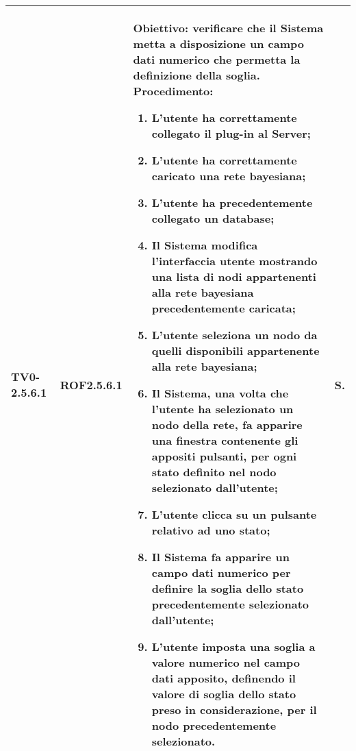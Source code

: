 \begin{longtable}{|C{.15\textwidth}|C{.13\textwidth}|m{.65\textwidth}|C{.08\textwidth}|}
TV0-2.5.6.1 & ROF2.5.6.1 &
	\textbf{Obiettivo}: verificare che il Sistema metta a disposizione un campo dati numerico che permetta la definizione della soglia. \newline
	\textbf{Procedimento}:
	\begin{enumerate}
		\item L'utente ha correttamente collegato il plug-in al Server;
		\item L'utente ha correttamente caricato una rete bayesiana;
		\item L'utente ha precedentemente collegato un database;
		\item Il Sistema modifica l'interfaccia utente mostrando una lista di nodi appartenenti alla rete bayesiana precedentemente caricata;
		\item L'utente seleziona un nodo da quelli disponibili appartenente alla rete bayesiana;
		\item Il Sistema, una volta che l'utente ha selezionato un nodo della rete, fa apparire una finestra contenente gli appositi pulsanti, per ogni stato definito nel nodo selezionato dall'utente;
		\item L'utente clicca su un pulsante relativo ad uno stato;
		\item Il Sistema fa apparire un campo dati numerico per definire la soglia dello stato precedentemente selezionato dall'utente;
		\item L'utente imposta una soglia a valore numerico nel campo dati apposito, definendo il valore di soglia dello stato preso in considerazione, per il nodo precedentemente selezionato.
	\end{enumerate}
	& S. \\
\hline


\end{longtable}
